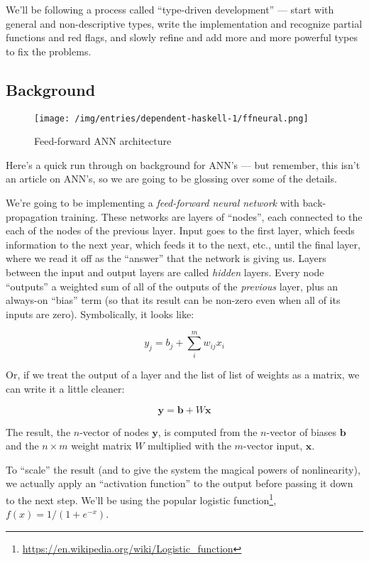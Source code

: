 \documentclass[]{article}
\renewcommand{\href}[2]{#2\footnote{\url{#1}}}
\begin{document}
We'll be following a process called ``type-driven development'' --- start with
general and non-descriptive types, write the implementation and recognize
partial functions and red flags, and slowly refine and add more and more
powerful types to fix the problems.

\subsection{Background}\label{background}

\begin{figure}[htbp]
\centering
\texttt{[image: /img/entries/dependent-haskell-1/ffneural.png]}
\caption{Feed-forward ANN architecture}
\end{figure}

Here's a quick run through on background for ANN's --- but remember, this isn't
an article on ANN's, so we are going to be glossing over some of the details.

We're going to be implementing a \emph{feed-forward neural network} with
back-propagation training. These networks are layers of ``nodes'', each
connected to the each of the nodes of the previous layer. Input goes to the
first layer, which feeds information to the next year, which feeds it to the
next, etc., until the final layer, where we read it off as the ``answer'' that
the network is giving us. Layers between the input and output layers are called
\emph{hidden} layers. Every node ``outputs'' a weighted sum of all of the
outputs of the \emph{previous} layer, plus an always-on ``bias'' term (so that
its result can be non-zero even when all of its inputs are zero). Symbolically,
it looks like:

\[
y_j = b_j + \sum_i^m w_{ij} x_i
\]

Or, if we treat the output of a layer and the list of list of weights as a
matrix, we can write it a little cleaner:

\[
\mathbf{y} = \mathbf{b} + W \mathbf{x}
\]

The result, the \(n\)-vector of nodes \(\mathbf{y}\), is computed from the
\(n\)-vector of biases \(\mathbf{b}\) and the \(n \times m\) weight matrix \(W\)
multiplied with the \(m\)-vector input, \(\mathbf{x}\).

To ``scale'' the result (and to give the system the magical powers of
nonlinearity), we actually apply an ``activation function'' to the output before
passing it down to the next step. We'll be using the popular
\href{https://en.wikipedia.org/wiki/Logistic_function}{logistic function},
\(f(x) = 1 / (1 + e^{-x})\).
\end{document}
